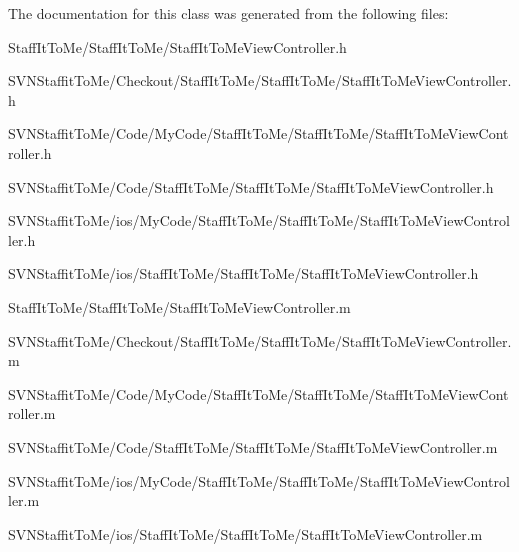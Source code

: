 \-The documentation for this class was generated from the following files\-:\begin{DoxyCompactItemize}
\item 
\-Staff\-It\-To\-Me/\-Staff\-It\-To\-Me/\-Staff\-It\-To\-Me\-View\-Controller.\-h\item 
\-S\-V\-N\-Staffit\-To\-Me/\-Checkout/\-Staff\-It\-To\-Me/\-Staff\-It\-To\-Me/\-Staff\-It\-To\-Me\-View\-Controller.\-h\item 
\-S\-V\-N\-Staffit\-To\-Me/\-Code/\-My\-Code/\-Staff\-It\-To\-Me/\-Staff\-It\-To\-Me/\-Staff\-It\-To\-Me\-View\-Controller.\-h\item 
\-S\-V\-N\-Staffit\-To\-Me/\-Code/\-Staff\-It\-To\-Me/\-Staff\-It\-To\-Me/\-Staff\-It\-To\-Me\-View\-Controller.\-h\item 
\-S\-V\-N\-Staffit\-To\-Me/ios/\-My\-Code/\-Staff\-It\-To\-Me/\-Staff\-It\-To\-Me/\-Staff\-It\-To\-Me\-View\-Controller.\-h\item 
\-S\-V\-N\-Staffit\-To\-Me/ios/\-Staff\-It\-To\-Me/\-Staff\-It\-To\-Me/\-Staff\-It\-To\-Me\-View\-Controller.\-h\item 
\-Staff\-It\-To\-Me/\-Staff\-It\-To\-Me/\-Staff\-It\-To\-Me\-View\-Controller.\-m\item 
\-S\-V\-N\-Staffit\-To\-Me/\-Checkout/\-Staff\-It\-To\-Me/\-Staff\-It\-To\-Me/\-Staff\-It\-To\-Me\-View\-Controller.\-m\item 
\-S\-V\-N\-Staffit\-To\-Me/\-Code/\-My\-Code/\-Staff\-It\-To\-Me/\-Staff\-It\-To\-Me/\-Staff\-It\-To\-Me\-View\-Controller.\-m\item 
\-S\-V\-N\-Staffit\-To\-Me/\-Code/\-Staff\-It\-To\-Me/\-Staff\-It\-To\-Me/\-Staff\-It\-To\-Me\-View\-Controller.\-m\item 
\-S\-V\-N\-Staffit\-To\-Me/ios/\-My\-Code/\-Staff\-It\-To\-Me/\-Staff\-It\-To\-Me/\-Staff\-It\-To\-Me\-View\-Controller.\-m\item 
\-S\-V\-N\-Staffit\-To\-Me/ios/\-Staff\-It\-To\-Me/\-Staff\-It\-To\-Me/\-Staff\-It\-To\-Me\-View\-Controller.\-m\end{DoxyCompactItemize}
